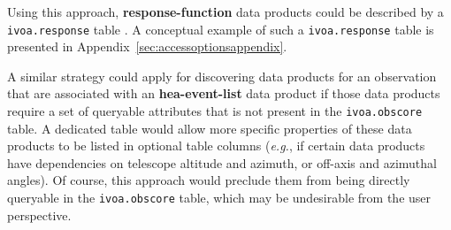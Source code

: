 Using this approach, {\bf response-function} data products could be described by a {\tt ivoa.response} table .
A conceptual example of such a  {\tt ivoa.response} table is presented in Appendix~\ref{sec:accessoptionsappendix}.

A similar strategy could apply for discovering data products for an observation that are associated with an {\bf hea-event-list} data product if those data products require a set of queryable attributes that is not present in the {\tt ivoa.obscore} table.  A dedicated table would allow more specific properties of these data products to be listed in optional table columns ({\em e.g.\/}, if certain data products have dependencies on telescope altitude and azimuth, or off-axis and azimuthal angles).  Of course, this approach would preclude them from being directly queryable in the {\tt ivoa.obscore} table, which may be undesirable from the user perspective.


